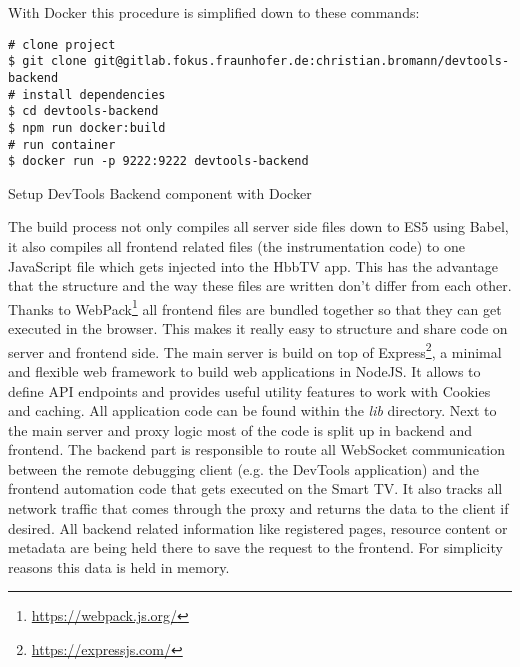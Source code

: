 With Docker this procedure is simplified down to these commands:

\vspace{1cm}
\begin{listing}[H]
\begin{verbatim}
# clone project
$ git clone git@gitlab.fokus.fraunhofer.de:christian.bromann/devtools-backend
# install dependencies
$ cd devtools-backend
$ npm run docker:build
# run container
$ docker run -p 9222:9222 devtools-backend
\end{verbatim}
\caption{Setup DevTools Backend component with Docker}
\label{lst:setupdevtools}
\end{listing}
\vspace{0.5cm}

The build process not only compiles all server side files down to ES5 using Babel, it also compiles
all frontend related files (the instrumentation code) to one JavaScript file which gets injected
into the HbbTV app. This has the advantage that the structure and the way these files are written
don't differ from each other. Thanks to WebPack\footnote{\url{https://webpack.js.org/}} all frontend
files are bundled together so that they can get executed in the browser. This makes it really easy
to structure and share code on server and frontend side. The main server is build on top of Express\footnote{\url{https://expressjs.com/}},
a minimal and flexible web framework to build web applications in NodeJS. It allows to define API
endpoints and provides useful utility features to work with Cookies and caching. All application code
can be found within the \textit{lib} directory. Next to the main server and proxy logic most of the
code is split up in backend and frontend. The backend part is responsible to route all WebSocket
communication between the remote debugging client (e.g. the DevTools application) and the frontend
automation code that gets executed on the Smart TV. It also tracks all network traffic that comes
through the proxy and returns the data to the client if desired. All backend related information
like registered pages, resource content or metadata are being held there to save the request to the
frontend. For simplicity reasons this data is held in memory.

